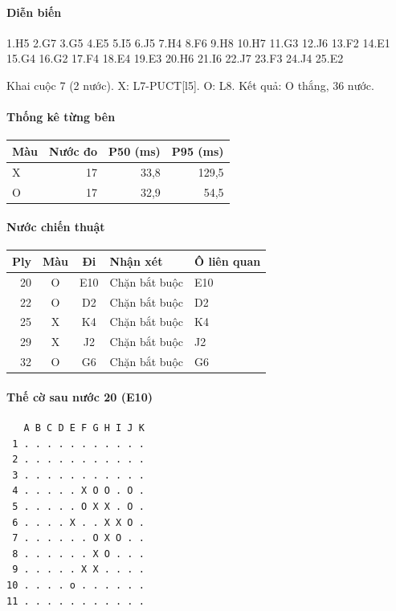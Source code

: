 \paragraph{Diễn biến}
{\footnotesize 1.H5 2.G7 3.G5 4.E5 5.I5 6.J5 7.H4 8.F6 9.H8 10.H7 11.G3 12.J6 13.F2 14.E1 15.G4 16.G2 17.F4 18.E4 19.E3 20.H6 21.I6 22.J7 23.F3 24.J4 25.E2\par}
Khai cuộc 7 (2 nước). X: L7-PUCT[l5]. O: L8. Kết quả: O thắng, 36 nước.
\paragraph{Thống kê từng bên}
\begin{center}\small
\begin{tabular}{@{}lrrr@{}}
\toprule
Màu & Nước đo & P50 (ms) & P95 (ms) \\
\midrule
X & 17 & 33,8 & 129,5 \\
O & 17 & 32,9 & 54,5 \\
\bottomrule
\end{tabular}
\end{center}
\paragraph{Nước chiến thuật}
\begin{center}\small
\begin{tabular}{@{}rccll@{}}
\toprule
Ply & Màu & Đi & Nhận xét & Ô liên quan \\
\midrule
20 & O & E10 & Chặn bắt buộc & E10 \\
22 & O & D2 & Chặn bắt buộc & D2 \\
25 & X & K4 & Chặn bắt buộc & K4 \\
29 & X & J2 & Chặn bắt buộc & J2 \\
32 & O & G6 & Chặn bắt buộc & G6 \\
\bottomrule
\end{tabular}
\end{center}
\paragraph{Thế cờ sau nước 20 (E10)}
\begin{verbatim}
   A B C D E F G H I J K
 1 . . . . . . . . . . .
 2 . . . . . . . . . . .
 3 . . . . . . . . . . .
 4 . . . . . X O O . O .
 5 . . . . . O X X . O .
 6 . . . . X . . X X O .
 7 . . . . . . O X O . .
 8 . . . . . . X O . . .
 9 . . . . . X X . . . .
10 . . . . o . . . . . .
11 . . . . . . . . . . .
\end{verbatim}
